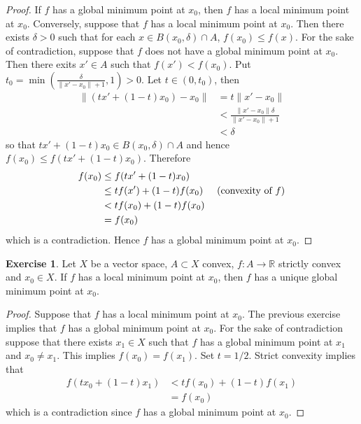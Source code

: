 \documentclass[12pt]{amsart}
\theoremstyle{definition}
\newtheorem{ex}[definition]{Exercise}
\newcommand{\del}{\delta}
\newcommand{\R}{\mathbb{R}}
\newcommand{\lex}[1]{\label{ex:#1}}
\begin{document}
	\begin{proof}
	If $f$ has a global minimum point at $x_0$, then $f$ has a local minimum point at $x_0$. Conversely, suppose that $f$ has a local minimum point at $x_0$. Then there exists $\del >0$ such that for each $x \in B(x_0, \del) \cap A$, $f(x_0) \leq f(x)$. For the sake of contradiction, suppose that $f$ does not have a global minimum point at $x_0$. Then there exits $x' \in A$ such that $f(x') < f(x_0)$. Put $t_0 = \min(\frac{\del}{\|x' - x_0\| + 1}, 1) >0$. Let $t \in (0, t_0)$, then
	\begin{align*}
	\|(tx' + (1-t)x_0) - x_0\| 
	&= t\|x' -x_0 \| \\
	& <   \frac{\|x' -x_0 \|\del}{\|x' -x_0\| + 1} \\
	& < \del
	\end{align*} 
	so that $tx' + (1-t)x_0 \in B(x_0, \del) \cap A$ and hence $f(x_0) \leq f(tx' + (1-t)x_0)$.  Therefore  
	\begin{align*}
	f(x_0) 
	& \leq f(tx' + (1-t)x_0) \\
	& \leq tf(x') + (1-t)f(x_0)  \hspace{.5cm} (\text{convexity of }f)\\
	& < tf(x_0) + (1-t)f(x_0) \\
	&= f(x_0)
	\end{align*}
	which is a contradiction. Hence $f$ has a global minimum point at $x_0$.
	\end{proof}
	
	\begin{ex} \lex{91010}
	Let $X$ be a vector space, $A \subset X$ convex, $f:A \rightarrow \R$ strictly convex and $x_0 \in X$. If $f$ has a local minimum point at $x_0$, then $f$ has a unique global minimum point at $x_0$.  
	\end{ex}
	
	\begin{proof}
	Suppose that $f$ has a local minimum point at $x_0$. The previous exercise implies that $f$ has a global minimum point at $x_0$. For the sake of contradiction suppose that there exists $x_1 \in X$ such that $f$ has a global minimum point at $x_1$ and $x_0 \neq x_1$. This implies $f(x_0) = f(x_1)$. Set $t = 1/2$. Strict convexity implies that 
	\begin{align*}
	f(tx_0 + (1-t)x_1) 
	&< tf(x_0) + (1-t)f(x_1)  \\
	&= f(x_0) 
	\end{align*}
	which is a contradiction since $f$ has a global minimum point at $x_0$.
	\end{proof}
\end{document}
